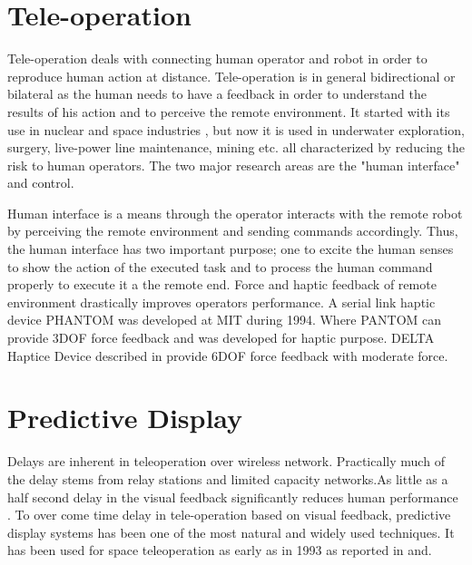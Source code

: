    
\section{Tele-operation}
Tele-operation deals with  connecting   human operator and robot in order to reproduce human action at distance. Tele-operation is in general bidirectional or bilateral as the human needs to have a feedback in order to understand the results of his action and to perceive the remote environment. It started with its use in nuclear and space industries \cite{martin1985teleoperated,vertut1986teleoperations}, but now it is used in underwater exploration, surgery, live-power line maintenance, mining etc. all characterized by reducing the risk to human operators. The two major research areas are the "human interface" and control.

Human interface is a means through the operator interacts with the remote robot by perceiving the remote environment and sending commands accordingly. Thus, the human interface has two important purpose; one to excite the human senses to show the action of the executed task and to process the human command properly to execute it a the remote end.  Force and haptic feedback of remote environment drastically improves operators performance. A serial link haptic device PHANTOM \cite{massie1994phantom} was developed at MIT during 1994. Where PANTOM can provide 3DOF force feedback and was developed for haptic purpose. DELTA Haptice Device described in \cite{grange2001overview} provide 6DOF force feedback with moderate force. 


\section{Predictive Display}
Delays are inherent in teleoperation over wireless network. Practically much of the delay stems from
relay stations and limited capacity networks.As little as a half second delay in the visual feedback significantly reduces human performance \cite{chen2007human}.  To over come time delay in tele-operation based on visual feedback, predictive display systems has been one of the most natural and widely used techniques. It has been used for space teleoperation as early as in 1993 as reported in \cite{sheridan1993space} and\cite{kim1993demonstration}.


